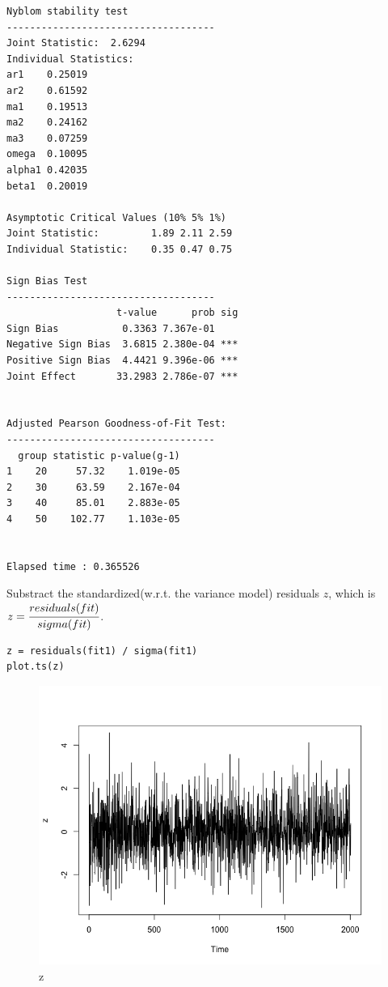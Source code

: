 \documentclass[a4paper, 11pt]{article}
\begin{document}
\begin{verbatim}
Nyblom stability test
------------------------------------
Joint Statistic:  2.6294
Individual Statistics:              
ar1    0.25019
ar2    0.61592
ma1    0.19513
ma2    0.24162
ma3    0.07259
omega  0.10095
alpha1 0.42035
beta1  0.20019

Asymptotic Critical Values (10% 5% 1%)
Joint Statistic:     	 1.89 2.11 2.59
Individual Statistic:	 0.35 0.47 0.75

Sign Bias Test
------------------------------------
                   t-value      prob sig
Sign Bias           0.3363 7.367e-01    
Negative Sign Bias  3.6815 2.380e-04 ***
Positive Sign Bias  4.4421 9.396e-06 ***
Joint Effect       33.2983 2.786e-07 ***


Adjusted Pearson Goodness-of-Fit Test:
------------------------------------
  group statistic p-value(g-1)
1    20     57.32    1.019e-05
2    30     63.59    2.167e-04
3    40     85.01    2.883e-05
4    50    102.77    1.103e-05


Elapsed time : 0.365526
\end{verbatim}

\indent Substract the standardized(w.r.t. the variance model) residuals $z$, which is $z = \cfrac{residuals(fit)}{sigma(fit)}$.

\begin{verbatim}
z = residuals(fit1) / sigma(fit1)
plot.ts(z)
\end{verbatim}

\begin{figure}[H]
\centering
\caption{z}
\includegraphics[scale=.40]{z.png}
\end{figure}
\end{document}
